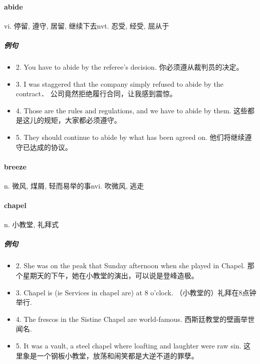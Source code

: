\documentclass[12pt]{book}
\begin{document}
\paragraph{abide}


vi. 停留, 遵守, 居留, 继续下去nvt. 忍受, 经受, 屈从于

\subparagraph{例句}

\begin{itemize}
    \item {2.  You have to abide by the referee's decision.  你必须遵从裁判员的决定。}
    \item {3.  I was staggered that the company simply refused to abide by the contract．  公司竟然拒绝履行合同，让我感到震惊。 }
    \item {4.  Those are the rules and regulations, and we have to abide by them.  这些都是这儿的规矩，大家都必须遵守。 }
    \item {5.  They should continue to abide by what has been agreed on.  他们将继续遵守已达成的协议。 }
\end{itemize}


\vspace{12pt}

\paragraph{breeze}

n. 微风, 煤屑, 轻而易举的事nvi. 吹微风, 逃走

\vspace{12pt}

\paragraph{chapel}

n. 小教堂, 礼拜式

\subparagraph{例句}

\begin{itemize}
    \item {2.  She was on the peak that Sunday afternoon when she played in Chapel.  那个星期天的下午，她在小教堂的演出，可以说是登峰造极。 }
    \item {3.  Chapel is (ie Services in chapel are) at 8 o'clock.  （小教堂的）礼拜在8点钟举行. }
    \item {4.  The frescos in the Sistine Chapel are world-famous.  西斯廷教堂的壁画举世闻名.}
    \item {5.  It was a vault, a steel chapel where loafting and laughter were raw sin.  这里象是一个钢板小教堂，放荡和闹笑都是大逆不道的罪孽。 }
\end{itemize}
\end{document}
